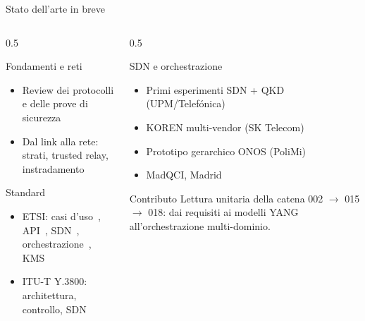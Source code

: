 \documentclass[10pt]{beamer}
\begin{document}
\begin{frame}{Stato dell'arte in breve}
  \small
  \begin{columns}[T]
    \begin{column}{0.5\textwidth}
      \begin{block}{Fondamenti e reti}
        \begin{itemize}
          \item Review dei protocolli e delle prove di sicurezza~\cite{pirandola2020}
          \item Dal link alla rete: strati, trusted relay,
                instradamento~\cite{mehic2020,cao2022,routing2024}
        \end{itemize}
      \end{block}
      \begin{block}{Standard}
        \begin{itemize}
          \item ETSI: casi d'uso~\cite{qkd002}, API~\cite{qkd004,qkd014},
                SDN~\cite{qkd015}, orchestrazione~\cite{qkd018}, KMS~\cite{qkd020}
          \item ITU-T Y.3800: architettura, controllo, SDN~\cite{ituy3800,ituy3804,ituy3805}
        \end{itemize}
      \end{block}
    \end{column}
    \begin{column}{0.5\textwidth}
      \begin{block}{SDN e orchestrazione}
        \begin{itemize}
          \item Primi esperimenti SDN + QKD (UPM/Telefónica)~\cite{aguado2016,aguado2020}
          \item KOREN multi-vendor (SK Telecom)~\cite{sim2023}
          \item Prototipo gerarchico ONOS (PoliMi)~\cite{vicario2025}
          \item MadQCI, Madrid~\cite{madqci2024}
        \end{itemize}
      \end{block}
      \begin{exampleblock}{Contributo}
        Lettura unitaria della catena 002 $\to$ 015 $\to$ 018: dai
        requisiti ai modelli YANG all'orchestrazione multi-dominio.
      \end{exampleblock}
    \end{column}
  \end{columns}
\end{frame}
\end{document}
